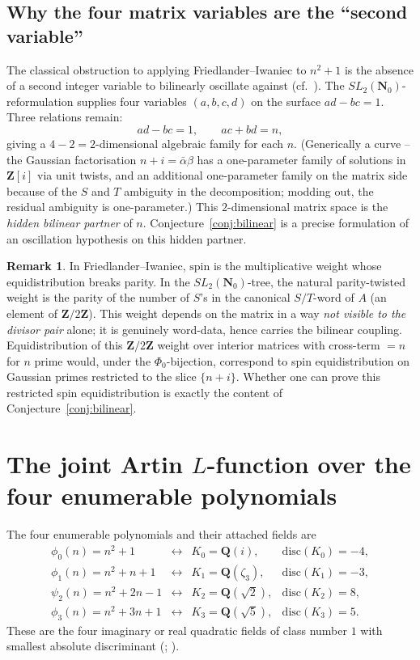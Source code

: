 \documentclass[11pt]{article}
\theoremstyle{definition}
\newtheorem{remark}[theorem]{Remark}
\newcommand{\Nz}{\mathbf{N}_0}
\newcommand{\Z}{\mathbf{Z}}
\newcommand{\Q}{\mathbf{Q}}
\newcommand{\SLNz}{SL_2(\Nz)}
\newcommand{\spin}{\mathrm{spin}}
\begin{document}
\subsection{Why the four matrix variables are the ``second variable''}

The classical obstruction to applying Friedlander--Iwaniec to $n^2+1$ is the absence of a
second integer variable to bilinearly oscillate against (cf.\ \cite{R3-friedlander-iwaniec}).
The $\SLNz$-reformulation supplies four variables $(a,b,c,d)$ on the surface $ad-bc=1$.
Three relations remain:
\[
   ad - bc = 1, \qquad ac + bd = n,
\]
giving a $4 - 2 = 2$-dimensional algebraic family for each $n$. (Generically a curve --
the Gaussian factorisation $n+i = \bar\alpha\beta$ has a one-parameter family of solutions
in $\Z[i]$ via unit twists, and an additional one-parameter family on the matrix side
because of the $S$ and $T$ ambiguity in the decomposition; modding out, the residual
ambiguity is one-parameter.) This $2$-dimensional matrix space is the
\emph{hidden bilinear partner} of $n$. Conjecture~\ref{conj:bilinear} is a precise
formulation of an oscillation hypothesis on this hidden partner.

\begin{remark}\label{rmk:spin-on-tree-vs-FI}
In Friedlander--Iwaniec, $\spin$ is the multiplicative weight whose equidistribution
breaks parity. In the $\SLNz$-tree, the natural parity-twisted weight is the parity of
the number of $S$'s in the canonical $S/T$-word of $A$ (an element of $\Z/2\Z$). This
weight depends on the matrix in a way \emph{not visible to the divisor pair} alone; it
is genuinely word-data, hence carries the bilinear coupling. Equidistribution of this
$\Z/2\Z$ weight over interior matrices with cross-term $= n$ for $n$ prime would, under
the $\Phi_0$-bijection, correspond to spin equidistribution on Gaussian primes restricted
to the slice $\{n+i\}$. Whether one can prove this restricted spin equidistribution is
exactly the content of Conjecture~\ref{conj:bilinear}.
\end{remark}

\section{The joint Artin $L$-function over the four enumerable polynomials}\label{sec:joint}

The four enumerable polynomials and their attached fields are
\[
\begin{array}{lcll}
   \phi_0(n) = n^2 + 1     & \leftrightarrow & K_0 = \Q(i),       & \mathrm{disc}(K_0) = -4,\\
   \phi_1(n) = n^2 + n + 1 & \leftrightarrow & K_1 = \Q(\zeta_3), & \mathrm{disc}(K_1) = -3,\\
   \psi_2(n) = n^2 + 2n - 1& \leftrightarrow & K_2 = \Q(\sqrt 2), & \mathrm{disc}(K_2) = 8,\\
   \phi_3(n) = n^2 + 3n + 1& \leftrightarrow & K_3 = \Q(\sqrt 5), & \mathrm{disc}(K_3) = 5.
\end{array}
\]
These are the four imaginary or real quadratic fields of class number $1$ with smallest
absolute discriminant (\cite[Ch.~5]{cox}; \cite{R4-binary-quadratic-forms}).
\end{document}
